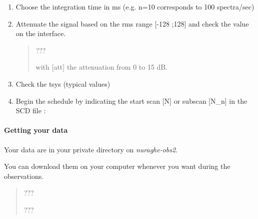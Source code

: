 \documentclass[letterpaper,10pt,english]{sphinxmanual}
\begin{document}
\begin{enumerate}
\begin{quote}
\begin{description}
\end{description}
\end{quote}

\item {} 
Choose the integration time in ms (e.g. n=10 corresponds to 100 spectra/sec)
\begin{quote}

\end{quote}

\item {} 
Attenuate the signal based on the rms range {[}-128 ;128{]} and check the value on the interface.
\begin{quote}

  ???

    with {[}att{]} the attenuation from 0 to 15 dB.
\end{quote}

\item {} 
Check the tsys (typical values)
\begin{quote}

\end{quote}

\item {} 
Begin the schedule by indicating the start scan {[}N{]} or subscan {[}N\_n{]} in the SCD file :
\begin{quote}

\end{quote}

\end{enumerate}


\paragraph{Getting your data}
\label{Continuum/C-band/SARDARA/get-data:getting-your-data}\label{Continuum/C-band/SARDARA/get-data::doc}
Your data are in your private directory on \emph{nuraghe-obs2}.

You can download them on your computer whenever you want during the observations.
\begin{quote}

  ???

 ???
\end{quote}
\end{document}
